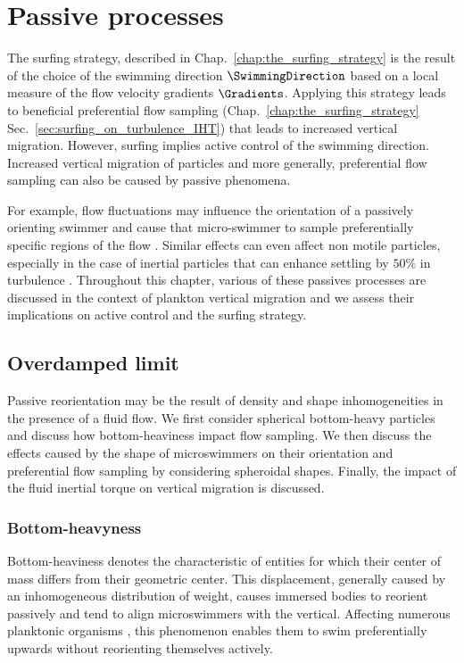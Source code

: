 \chapter{Passive processes}\label{chap:passives_processes}

The surfing strategy, described in Chap.~\ref{chap:the_surfing_strategy} is the result of the choice of the swimming direction $\SwimmingDirection$ based on a local measure of the flow velocity gradients $\Gradients$.
Applying this strategy leads to beneficial preferential flow sampling (Chap.~\ref{chap:the_surfing_strategy} Sec.~\ref{sec:surfing_on_turbulence_IHT}) that leads to increased vertical migration.
However, surfing implies active control of the swimming direction.
Increased vertical migration of particles and more generally, preferential flow sampling can also be caused by passive phenomena.

For example, flow fluctuations may influence the orientation of a passively orienting swimmer and cause that micro-swimmer to sample preferentially specific regions of the flow \citep{durham2013turbulence, gustavsson2016preferential, voth2017anisotropic}.
Similar effects can even affect non motile particles, especially in the case of inertial particles that can enhance settling by $50\%$ in turbulence \citep{wang1993settling}.
Throughout this chapter, various of these passives processes are discussed in the context of plankton vertical migration and we assess their implications on active control and the surfing strategy.

\section{Overdamped limit}

Passive reorientation may be the result of density and shape inhomogeneities in the presence of a fluid flow.
We first consider spherical bottom-heavy particles and discuss how bottom-heaviness impact flow sampling.
We then discuss the effects caused by the shape of microswimmers on their orientation and preferential flow sampling by considering spheroidal shapes.
Finally, the impact of the fluid inertial torque on vertical migration is discussed.

\subsection{Bottom-heavyness}

Bottom-heaviness denotes the characteristic of entities for which their center of mass differs from their geometric center.
This displacement, generally caused by an inhomogeneous distribution of weight, causes immersed bodies to reorient passively and tend to align microswimmers with the vertical.
Affecting numerous planktonic organisms \citep{wheeler2019not, chan2012biomechanics, mogami2001theoretical}, this phenomenon enables them to swim preferentially upwards without reorienting themselves actively.

